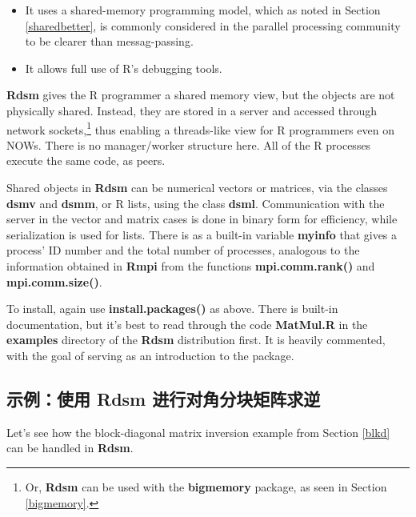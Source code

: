 \begin{itemize}

\item It uses a shared-memory programming model, which as noted in
Section \ref{sharedbetter}, is commonly considered in the parallel
processing community to be clearer than messag-passing.

\item It allows full use of R's debugging tools.

\end{itemize}

{\bf Rdsm} gives the R programmer a shared memory view, but the objects
are not physically shared.  Instead, they are stored in a server and
accessed through network sockets,\footnote{Or, {\bf Rdsm} can be used
with the {\bf bigmemory} package, as seen in Section \ref{bigmemory}.}
thus enabling a threads-like view for R programmers even on NOWs.  There
is no manager/worker structure here.  All of the R processes execute the
same code, as peers.

Shared objects in {\bf Rdsm} can be numerical vectors or matrices, via
the classes {\bf dsmv} and {\bf dsmm}, or R lists, using the class {\bf
dsml}.  Communication with the server in the vector and matrix cases is
done in binary form for efficiency, while serialization is used for
lists.  There is as a built-in variable {\bf myinfo} that gives a
process' ID number and the total number of processes, analogous to the
information obtained in {\bf Rmpi} from the functions {\bf
mpi.comm.rank()} and {\bf mpi.comm.size()}.

To install, again use {\bf install.packages()} as above.  There is
built-in documentation, but it's best to read through the code {\bf
MatMul.R} in the {\bf examples} directory of the {\bf Rdsm} distribution
first.  It is heavily commented, with the goal of serving as an
introduction to the package.

\subsection{示例：使用 Rdsm 进行对角分块矩阵求逆}

Let's see how the block-diagonal matrix inversion example from Section
\ref{blkd} can be handled in {\bf Rdsm}.

